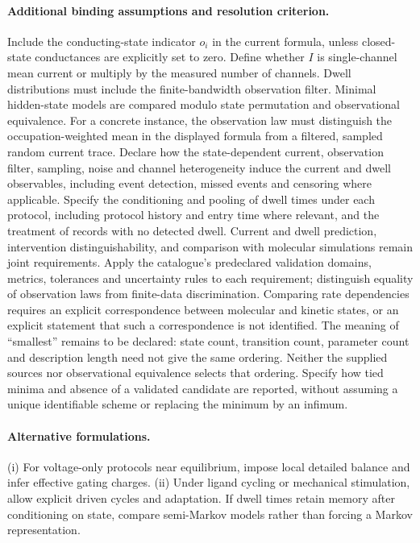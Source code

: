 \documentclass[11pt]{article}
\begin{document}
\paragraph{Additional binding assumptions and resolution criterion.} Include the conducting-state indicator $o_i$ in the current formula, unless closed-state conductances are explicitly set to zero. Define whether $I$ is single-channel mean current or multiply by the measured number of channels. Dwell distributions must include the finite-bandwidth observation filter. Minimal hidden-state models are compared modulo state permutation and observational equivalence.
For a concrete instance, the observation law must distinguish the occupation-weighted mean in the displayed formula from a filtered, sampled random current trace. Declare how the state-dependent current, observation filter, sampling, noise and channel heterogeneity induce the current and dwell observables, including event detection, missed events and censoring where applicable. Specify the conditioning and pooling of dwell times under each protocol, including protocol history and entry time where relevant, and the treatment of records with no detected dwell. Current and dwell prediction, intervention distinguishability, and comparison with molecular simulations remain joint requirements. Apply the catalogue's predeclared validation domains, metrics, tolerances and uncertainty rules to each requirement; distinguish equality of observation laws from finite-data discrimination. Comparing rate dependencies requires an explicit correspondence between molecular and kinetic states, or an explicit statement that such a correspondence is not identified. The meaning of ``smallest'' remains to be declared: state count, transition count, parameter count and description length need not give the same ordering. Neither the supplied sources nor observational equivalence selects that ordering. Specify how tied minima and absence of a validated candidate are reported, without assuming a unique identifiable scheme or replacing the minimum by an infimum.

\paragraph{Alternative formulations.} (i) For voltage-only protocols near equilibrium, impose local detailed balance and infer effective gating charges. (ii) Under ligand cycling or mechanical stimulation, allow explicit driven cycles and adaptation. If dwell times retain memory after conditioning on state, compare semi-Markov models rather than forcing a Markov representation.
\end{document}
